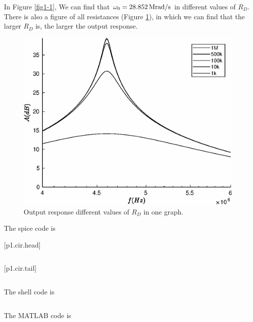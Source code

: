 \documentclass{article}
\newcommand{\unit}[1]{{\rm\,#1}}
\begin{document}
In Figure \ref{fig1-1}, We can find that $\omega_0=28.852\unit{Mrad/s}$ in different values of $R_D$. There is also a figure of all resistances (Figure \ref{fig1-2}), in which we can find that the larger $R_D$ is, the larger the output response.

\begin{figure}[!htbp]
\centering
\includegraphics[width=0.6\linewidth]{p1.eps}
\caption{Output response different values of $R_D$ in one graph.}
\label{fig1-2}
\end{figure}

The spice code is

[p1.cir.head]
\inputminted[linenos,xleftmargin=1.5em]{v}{p1.cir.head}

[p1.cir.tail]
\inputminted[linenos,xleftmargin=1.5em]{v}{p1.cir.tail}

The shell code is

\inputminted[linenos,xleftmargin=1.5em]{shell}{p1.sh}

The MATLAB code is

\inputminted[linenos,xleftmargin=1.5em,breaklines]{matlab}{p1.m}
\end{document}
